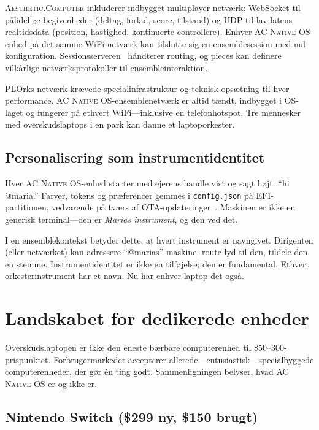 \documentclass[10pt,letterpaper,twocolumn]{article}
\newcommand{\ac}{\textsc{Aesthetic.Computer}}
\newcommand{\acos}{\textsc{AC Native OS}}
\begin{document}
\ac{} inkluderer indbygget multiplayer-netv{\ae}rk: WebSocket til p{\aa}lidelige begivenheder (deltag, forlad, score, tilstand) og UDP til lav-latens realtidsdata (position, hastighed, kontinuerte controllere). Enhver \acos{}-enhed p{\aa} det samme WiFi-netv{\ae}rk kan tilslutte sig en ensemblesession med nul konfiguration. Sessionsserveren~\citep{scudder2026ac} h{\aa}ndterer routing, og pieces kan definere vilk{\aa}rlige netv{\ae}rksprotokoller til ensembleinteraktion.

PLOrks netv{\ae}rk kr{\ae}vede specialinfrastruktur og teknisk ops{\ae}tning til hver performance. \acos{}-ensemblenetv{\ae}rk er altid t{\ae}ndt, indbygget i OS-laget og fungerer p{\aa} ethvert WiFi---inklusive en telefonhotspot. Tre mennesker med overskudslaptops i en park kan danne et laptoporkester.

\subsection{Personalisering som instrumentidentitet}

Hver \acos{}-enhed starter med ejerens handle vist og sagt h{\o}jt: ``hi @maria.'' Farver, tokens og pr{\ae}ferencer gemmes i \texttt{config.json} p{\aa} EFI-partitionen, vedvarende p{\aa} tv{\ae}rs af OTA-opdateringer~\citep{scudder2026os}. Maskinen er ikke en generisk terminal---den er \emph{Marias instrument}, og den ved det.

I en ensemblekontekst betyder dette, at hvert instrument er navngivet. Dirigenten (eller netv{\ae}rket) kan adressere ``@marias'' maskine, route lyd til den, tildele den en stemme. Instrumentidentitet er ikke en tilf{\o}jelse; den er fundamental. Ethvert orkesterinstrument har et navn. Nu har enhver laptop det ogs{\aa}.


\section{Landskabet for dedikerede enheder}
\label{sec:devices}

Overskudslaptopen er ikke den eneste b{\ae}rbare computerenhed til \$50--300-prispunktet. Forbrugermarkedet accepterer allerede---entusiastisk---specialbyggede computerenheder, der g{\o}r \'{e}n ting godt. Sammenligningen belyser, hvad \acos{} er og ikke er.

\subsection{Nintendo Switch (\$299 ny, \$150 brugt)}
\end{document}
